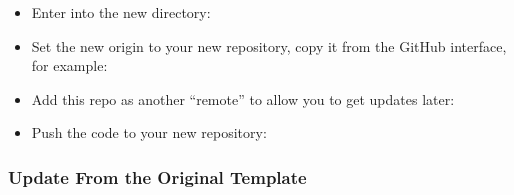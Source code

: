 \begin{itemize}
\tightlist
\item
  Enter into the new directory:
\end{itemize}

\begin{Shaded}
\begin{Highlighting}[]
\end{Highlighting}
\end{Shaded}

\begin{itemize}
\tightlist
\item
  Set the new origin to your new repository, copy it from the GitHub
  interface, for example:
\end{itemize}

\begin{Shaded}
\begin{Highlighting}[]
\end{Highlighting}
\end{Shaded}

\begin{itemize}
\tightlist
\item
  Add this repo as another ``remote'' to allow you to get updates later:
\end{itemize}

\begin{Shaded}
\begin{Highlighting}[]
\end{Highlighting}
\end{Shaded}

\begin{itemize}
\tightlist
\item
  Push the code to your new repository:
\end{itemize}

\begin{Shaded}
\begin{Highlighting}[]
\end{Highlighting}
\end{Shaded}

\hypertarget{update-from-the-original-template}{%
\subsubsection{Update From the Original
Template}\label{update-from-the-original-template}}

